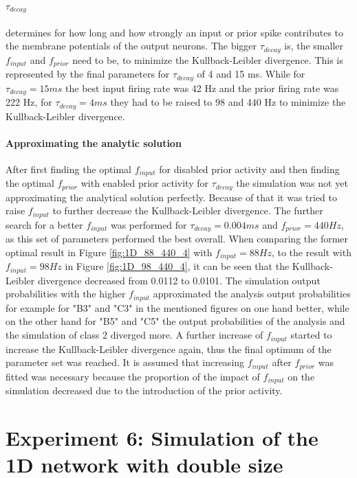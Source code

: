 \paragraph{$\tau_{decay}$} determines for how long and how strongly an input or prior spike contributes to the membrane potentials of the output neurons. The bigger $\tau_{decay}$ is, the smaller $f_{input}$ and $f_{prior}$ need to be, to minimize the Kullback-Leibler divergence. This is represented by the final parameters for $\tau_{decay}$ of 4 and 15 ms. While for $\tau_{decay} = 15 ms$ the best input firing rate was 42 Hz and the prior firing rate was 222 Hz, for $\tau_{decay} = 4 ms$ they had to be raised to 98 and 440 Hz to minimize the Kullback-Leibler divergence.

\paragraph{Approximating the analytic solution}
After first finding the optimal $f_{input}$ for disabled prior activity and then finding the optimal $f_{prior}$ with enabled prior activity for $\tau_{decay}$ the simulation was not yet approximating the analytical solution perfectly. Because of that it was tried to raise $f_{input}$ to further decrease the Kullback-Leibler divergence. The further search for a better $f_{input}$ was performed for $\tau_{decay} = 0.004 ms$ and $f_{prior} = 440 Hz$, as this set of parameters performed the best overall.
When comparing the former optimal result in Figure \ref{fig:1D_88_440_4} with $f_{input} = 88 Hz$, to the result with $f_{input} = 98 Hz$ in Figure \ref{fig:1D_98_440_4}, it can be seen that the Kullback-Leibler divergence decreased from 0.0112 to 0.0101. The simulation output probabilities with the higher $f_{input}$ approximated the analysis output probabilities for example for "B3" and "C3" in the mentioned figures on one hand better, while on the other hand for "B5" and "C5" the output probabilities of the analysis and the simulation of class 2 diverged more. A further increase of $f_{input}$ started to increase the Kullback-Leibler divergence again, thus the final optimum of the parameter set was reached. It is assumed that increasing $f_{input}$ after $f_{prior}$ was fitted was necessary because the proportion of the impact of $f_{input}$ on the simulation decreased due to the introduction of the prior activity.

\section{Experiment 6: Simulation of the 1D network with double size}
\label{section:1DDoubleSize}

